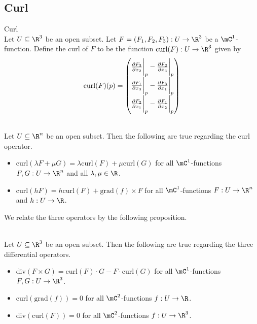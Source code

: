 \documentclass[a4paper]{article}
\begin{document}
\subsection{Curl}
\begin{defn}{Curl}{}\\
Let $U\subseteq\R^3$ be an open subset. Let $F=(F_1,F_2,F_3):U\to\R^3$ be a $\mC^1$-function. Define the curl of $F$ to be the function $\text{curl}(F):U\to\R^3$ given by $$\text{curl}(F)(p)=\begin{pmatrix}
\frac{\partial F_3}{\partial x_2}\bigg{|}_p-\frac{\partial F_2}{\partial x_3}\bigg{|}_p\\
\frac{\partial F_1}{\partial x_3}\bigg{|}_p-\frac{\partial F_3}{\partial x_1}\bigg{|}_p\\
\frac{\partial F_2}{\partial x_1}\bigg{|}_p-\frac{\partial F_1}{\partial x_2}\bigg{|}_p
\end{pmatrix}$$
\end{defn}

\begin{prp}{}{}\\
Let $U\subseteq\R^n$ be an open subset. Then the following are true regarding the curl operator. 
\begin{itemize}
\item $\text{curl}(\lambda F+\mu G)=\lambda\text{curl}(F)+\mu\text{curl}(G)$ for all $\mC^1$-functions $F,G:U\to\R^n$ and all $\lambda,\mu\in\R$. 
\item $\text{curl}(hF)=h\text{curl}(F)+\text{grad}(f)\times F$ for all $\mC^1$-functions $F:U\to\R^n$ and $h:U\to\R$. 
\end{itemize}
\end{prp}

We relate the three operators by the following proposition. 

\begin{prp}{}{}\\
Let $U\subseteq\R^3$ be an open subset. Then the following are true regarding the three differential operators. 
\begin{itemize}
\item $\text{div}(F\times G)=\text{curl}(F)\cdot G-F\cdot\text{curl}(G)$ for all $\mC^1$-functions $F,G:U\to\R^3$. 
\item $\text{curl}(\text{grad}(f))=0$ for all $\mC^2$-functions $f:U\to\R$. 
\item $\text{div}(\text{curl}(F))=0$ for all $\mC^2$-functions $f:U\to\R^3$. 
\end{itemize}
\end{prp}
\end{document}

